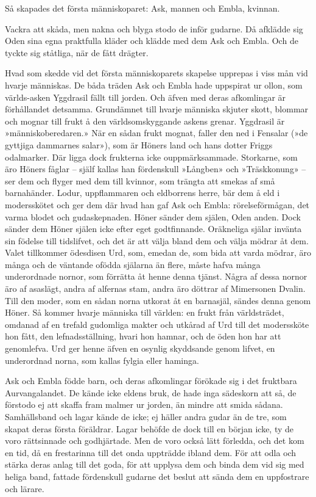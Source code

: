 Så skapades det första människoparet: Ask, mannen och Embla, kvinnan.

Vackra att skåda, men nakna och blyga stodo de inför gudarne. Då
afklädde sig Oden sina egna praktfulla kläder och klädde med dem Ask och
Embla. Och de tyckte sig ståtliga, när de fått drägter.

Hvad som skedde vid det första människoparets skapelse upprepas i viss
mån vid hvarje människas. De båda träden Ask och Embla hade uppspirat ur
ollon, som världs-asken Yggdrasil fällt till jorden. Och äfven med deras
afkomlingar är förhållandet detsamma. Grundämnet till hvarje människa
skjuter skott, blommar och mognar till frukt å den världsomskyggande
askens grenar. Yggdrasil är »människoberedaren.» När en sådan frukt
mognat, faller den ned i Fensalar (»de gyttjiga dammarnes salar»), som
är Höners land och hans dotter Friggs odalmarker. Där ligga dock
frukterna icke ouppmärksammade. Storkarne, som äro Höners fåglar --
själf kallas han fördenskull »Långben» och »Träskkonung» -- ser dem och
flyger med dem till kvinnor, som trängta att smekas af små barnahänder.
Lodur, uppflammaren och eldborrens herre, bär dem å eld i modersskötet
och ger dem där hvad han gaf Ask och Embla: rörelseförmågan, det varma
blodet och gudaskepnaden. Höner sänder dem själen, Oden anden. Dock
sänder dem Höner själen icke efter eget godtfinnande. Oräkneliga själar
invänta sin födelse till tidslifvet, och det är att välja bland dem och
välja mödrar åt dem. Valet tillkommer ödesdisen Urd, som, emedan de, som
bida att varda mödrar, äro många och de väntande ofödda själarna än
flere, måste hafva många underordnade nornor, som förrätta åt henne
denna tjänst. Några af dessa nornor äro af asaslägt, andra af alfernas
stam, andra äro döttrar af Mimersonen Dvalin. Till den moder, som en
sådan norna utkorat åt en barnasjäl, sändes denna genom Höner. Så kommer
hvarje människa till världen: en frukt från världsträdet, omdanad af en
trefald gudomliga makter och utkårad af Urd till det moderssköte hon
fått, den lefnadsställning,
hvari hon hamnar, och de öden hon har att genomlefva. Urd ger henne
äfven en osynlig skyddsande genom lifvet, en underordnad norna, som
kallas fylgia eller haminga.

Ask och Embla födde barn, och deras afkomlingar förökade sig i det
fruktbara Aurvangalandet. De kände icke eldens bruk, de hade inga
sädeskorn att så, de förstodo ej att skaffa fram malmer ur jorden, än
mindre att smida sådana. Samhällsband och lagar kände de icke; ej häller
andra gudar än de tre, som skapat deras första föräldrar. Lagar behöfde
de dock till en början icke, ty de voro rättsinnade och godhjärtade. Men
de voro också lätt förledda, och det kom en tid, då en frestarinna till
det onda uppträdde ibland dem. För att odla och stärka deras anlag till
det goda, för att upplysa dem och binda dem vid sig med heliga band,
fattade fördenskull gudarne det beslut att sända dem en uppfostrare och
lärare.


